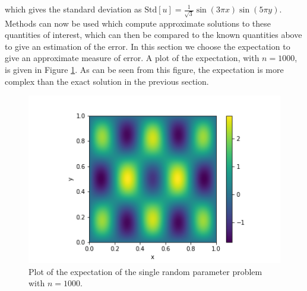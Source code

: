 \documentclass[11pt]{article}
\numberwithin{equation}{section}
\begin{document}
which gives the standard deviation as $\text{Std}[u] = \frac{1}{\sqrt{3}} \sin(3 \pi x) \sin(5 \pi y)$. Methods can now be used which compute approximate solutions to these quantities of interest, which can then be compared to the known quantities above to give an estimation of the error. In this section we choose the expectation to give an approximate measure of error. A plot of the expectation, with $n=1000$, is given in Figure \ref{fig:single}. As can be seen from this figure, the expectation is more complex than the exact solution in the previous section.

\begin{figure}[H]
\includegraphics[scale=.7]{img/single.png}
\centering
\caption{Plot of the expectation of the single random parameter problem with $n=1000$.}
\label{fig:single}
\end{figure} 
\end{document}
